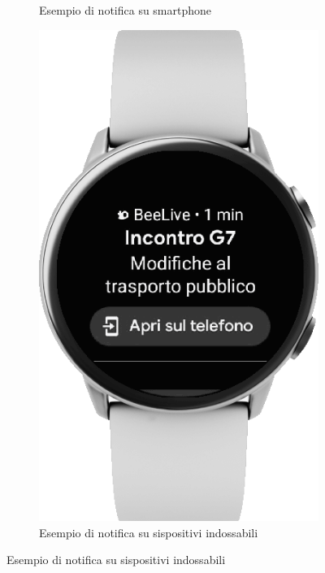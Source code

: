 \documentclass{article}
\begin{document}
\begin{figure}[h]
\begin{subfigure}[t]{0.35\textwidth}
        \caption{Esempio di notifica su smartphone}
        \label{4.1.3}
    \end{subfigure}%
    \hspace{0.05\textwidth} %
    \begin{subfigure}[t]{0.445\textwidth}
        \centering
        \includegraphics[width=\linewidth]{Images/Mockup1 - Wear.png}
        \caption{Esempio di notifica su sispositivi indossabili}
        \label{4.1.4}
    \end{subfigure}
\end{figure}
\end{document}
